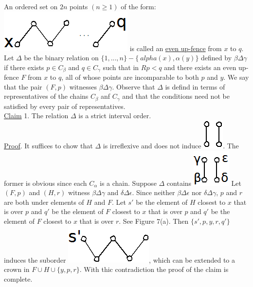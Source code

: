 \documentclass[twoside]{article}
\begin{document}
An ordered set on $2n$ points $(n\geq 1)$ of the form: \includegraphics[scale=0.2]{figures/small/small2.png}
is called an \underline {even up-fence}
from $x$ to $q$. Let $\Delta$ be the binary relation on $\{1,...,n\} - \{\ alpha (x), \alpha (y)\}$
defined by $\beta \Delta \gamma$ if there exists $p \in C_{\beta}$ and $q \in C_{\gamma}$
such that in $R p<q$ and there exists an even up-fence $F$ from $x$ to $q$, all of whose points
are incomparable to both $p$ and $y$. We say that the pair $(F,p)$ witnesses $\beta \Delta \gamma$.
Observe that $\Delta$ is defind in terms of representatives of the chains $C_{\beta}$ anf $C_{\gamma}$
and that the conditions need not be satisfied by every pair of representatives.\\
%
%
\newline
\underline{Claim} 1. The relation $\Delta$ is a strict interval order.\\
\newline
\underline{Proof}. It suffices to chow that $\Delta$ is irreflexive and does not induce \includegraphics[scale=0.25]{figures/small/small1.png}.
The former is obvious since each $C_{\alpha}$ is a chain. Suppose $\Delta$ contains \includegraphics[scale=0.25]{figures/small/small3.png}
Let $(F,p)$ and $(H,r)$ witness $\beta \Delta \gamma$ and $\delta \Delta \epsilon$. Since neither
$\beta \Delta \epsilon$ nor $\delta \Delta \gamma$, $p$ and $r$ are both under elements of $H$
and $F$. Let $s'$ be the element of $H$ closest to $x$ that is over $p$ and $q'$ be the element of $F$
closest to $x$ that is over $p$ and $q'$ be the element of $F$ closest to $x$ that is over $r$. See
Figure 7(a). Then $\{s',p,y,r,q'\}$ induces the suborder \includegraphics[scale=0.25]{figures/small/small4.png}, which can be extended to a crown in
$F \cup H \cup \{y,p,r\}$. With thic contradiction the proof of the claim is complete.\\
\end{document}
